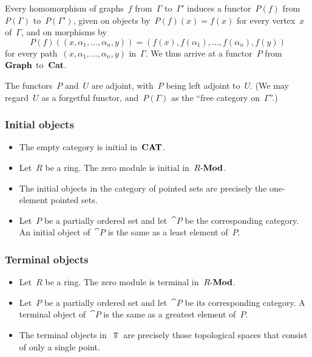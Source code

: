 \begin{itemize}
		Every homomorphism of graphs~$f$ from~$Γ$ to~$Γ'$ induces a functor~$P(f)$ from~$P(Γ)$ to~$P(Γ')$, given on objects by~$P(f)(x) = f(x)$ for every vertex~$x$ of~$Γ$, and on morphisms by
		\[
			P(f)( (x, α_1, \dotsc, α_n, y) )
			=
			( f(x), f(α_1), \dotsc, f(α_n), f(y) )
		\]
		for every path~$(x, α_1, \dotsc, α_n, y)$ in~$Γ$.
		We thus arrive at a functor~$P$ from~$\mathbf{Graph}$ to~$\mathbf{Cat}$.

		The functors~$P$ and~$U$ are adjoint, with~$P$ being left adjoint to~$U$.
		(We may regard~$U$ as a forgetful functor, and~$P(Γ)$ as the \enquote{free category on~$Γ$}.)
\end{itemize}



\subsubsection*{Initial objects}

\begin{itemize}

	\item
		The empty category is initial in~$\mathbf{CAT}$.

	\item
		Let~$R$ be a ring.
		The zero module is initial in~$R\text{-}\mathbf{Mod}$.

	\item
		The initial objects in the category of pointed sets are precisely the one-element pointed sets.

	\item
		Let~$P$ be a partially ordered set and let~$\cat{P}$ be the corresponding category.
		An initial object of~$\cat{P}$ is the same as a least element of~$P$.

\end{itemize}



\subsubsection*{Terminal objects}

\begin{itemize}

	\item
		Let~$R$ be a ring.
		The zero module is terminal in~$R\text{-}\mathbf{Mod}$.

	\item
		Let~$P$ be a partially ordered set and let~$\cat{P}$ be its corresponding category.
		A terminal object of~$\cat{P}$ is the same as a greatest element of~$P$.

	\item
		The terminal objects in~$\Top$ are precisely those topological spaces that consist of only a single point.

\end{itemize}
